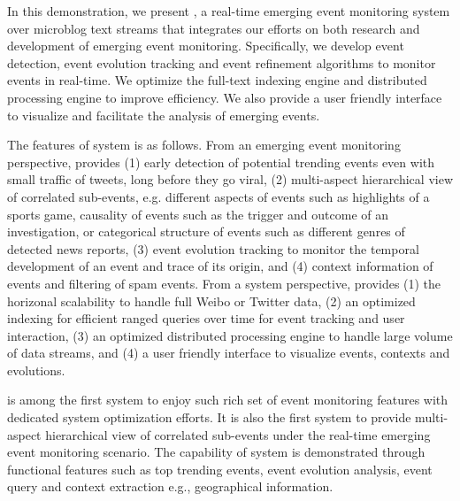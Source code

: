 In this demonstration, we present \ring, a real-time emerging event monitoring system over microblog text streams that integrates our efforts on both research and development of emerging event monitoring.
Specifically, we develop event detection, event evolution tracking and event refinement algorithms to monitor events in real-time.
We optimize the full-text indexing engine and distributed processing engine to improve efficiency.
We also provide a user friendly interface to visualize and facilitate the analysis of emerging events.

The features of \ring system is as follows.
%
From an emerging event monitoring perspective, \ring provides
(1) early detection of potential trending events even with small traffic of tweets, long before they go viral,
(2) multi-aspect hierarchical view of correlated sub-events, e.g. different aspects of events such as highlights of a sports game, causality of events such as the trigger and outcome of an investigation, or categorical structure of events such as different genres of detected news reports,
(3) event evolution tracking to monitor the temporal development of an event and trace of its origin, and
(4) context information of events and filtering of spam events.
From a system perspective, \ring provides
(1) the horizonal scalability to handle full Weibo or Twitter data,
(2) an optimized indexing for efficient ranged queries over time for event tracking and user interaction,
(3) an optimized distributed processing engine to handle large volume of data streams, and
(4) a user friendly  interface to visualize events, contexts and evolutions.

\ring is among the first system to enjoy such rich set of event monitoring features with dedicated system optimization efforts.
It is also the first system to provide multi-aspect hierarchical view of correlated sub-events under the real-time emerging event monitoring scenario.
The capability of \ring system is demonstrated through functional features such as top trending events, event evolution analysis, event query and context extraction e.g., geographical information.

